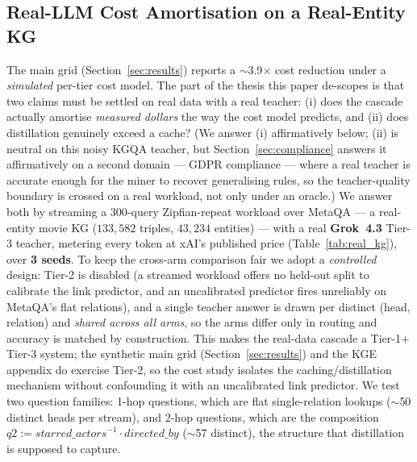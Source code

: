 \documentclass[11pt]{article}
\theoremstyle{plain}
\newcommand{\costFactor}{3.9}
\begin{document}
\subsection{Real-LLM Cost Amortisation on a Real-Entity KG}
\label{sec:realcost}
The main grid (Section~\ref{sec:results}) reports a $\sim$\costFactor$\times$
cost reduction under a \emph{simulated} per-tier cost model. The part of the
thesis this paper de-scopes is that two claims must be settled on real data with a
real teacher: (i) does the cascade actually amortise \emph{measured dollars}
the way the cost model predicts, and (ii) does distillation genuinely exceed a
cache? (We answer (i) affirmatively below; (ii) is neutral on this noisy KGQA teacher,
but Section~\ref{sec:compliance} answers it affirmatively on a second domain ---
GDPR compliance --- where a real teacher is accurate enough for the miner to
recover generalising rules, so the teacher-quality boundary is crossed on a real
workload, not only under an oracle.) We answer both by streaming a $300$-query Zipfian-repeat
workload over MetaQA --- a real-entity movie KG ($133{,}582$ triples,
$43{,}234$ entities) --- with a real \textbf{Grok~4.3} Tier-3 teacher, metering
every token at xAI's published price (Table~\ref{tab:real_kg}), over
\textbf{3 seeds}. To keep the cross-arm comparison fair we adopt a
\emph{controlled} design: Tier-2 is disabled (a streamed workload offers no
held-out split to calibrate the link predictor, and an uncalibrated predictor
fires unreliably on MetaQA's flat relations), and a single teacher answer is
drawn per distinct (head,\,relation) and \emph{shared across all arms}, so the
arms differ only in routing and accuracy is matched by construction. This makes
the real-data cascade a Tier-1$+$Tier-3 system; the synthetic main grid
(Section~\ref{sec:results}) and the KGE appendix do exercise Tier-2, so the cost
study isolates the caching/distillation mechanism without confounding it with an
uncalibrated link predictor. We test two
question families: 1-hop questions, which are flat single-relation lookups
($\sim$50 distinct heads per stream), and 2-hop questions, which are the
composition $q2 := \mathit{starred\_actors}^{-1}\cdot\mathit{directed\_by}$
($\sim$57 distinct), the structure that distillation is supposed to capture.

\end{document}
